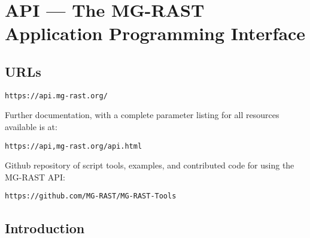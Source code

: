 \chapter{API --- The MG-RAST Application Programming Interface}
\label{API}

%

\section{URLs}
\begin{small}
\begin{verbatim}
https://api.mg-rast.org/
\end{verbatim}
\end{small} Further documentation, with a complete parameter listing for all resources available is at:
\begin{small}
\begin{verbatim}
https://api,mg-rast.org/api.html
\end{verbatim}
\end{small} Github repository of script tools, examples, and contributed code for using the MG-RAST API:
\begin{small}
\begin{verbatim}
https://github.com/MG-RAST/MG-RAST-Tools
\end{verbatim}
\end{small}
\section{Introduction}

